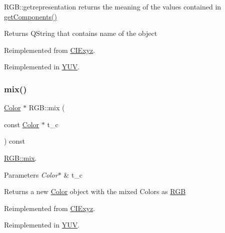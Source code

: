 R\+G\+B\+::getrepresentation returns the meaning of the values contained in \hyperlink{class_r_g_b_ad085d3bd654d874ea2e5739a5c216769}{get\+Components()} 

\begin{DoxyReturn}{Returns}
Q\+String that contains name of the object 
\end{DoxyReturn}


Reimplemented from \hyperlink{class_c_i_exyz_a19120c15d1304696909d76fae6065ebd}{C\+I\+Exyz}.



Reimplemented in \hyperlink{class_y_u_v_ae38403ffd397003eb28ab7670f95d1e5}{Y\+UV}.

\mbox{\label{class_r_g_b_aa022866e33474ab64f81d367c6b030b9}} 
\subsubsection{\texorpdfstring{mix()}{mix()}}
{\footnotesize\ttfamily \hyperlink{class_color}{Color} $\ast$ R\+G\+B\+::mix (\begin{DoxyParamCaption}\item[{const \hyperlink{class_color}{Color} $\ast$}]{t\+\_\+c }\end{DoxyParamCaption}) const\hspace{0.3cm}{\ttfamily [virtual]}}



\hyperlink{class_r_g_b_aa022866e33474ab64f81d367c6b030b9}{R\+G\+B\+::mix}. 


\begin{DoxyParams}{Parameters}
{\em Color$\ast$} & t\+\_\+c \\
\hline
\end{DoxyParams}
\begin{DoxyReturn}{Returns}
a new \hyperlink{class_color}{Color} object with the mixed Colors as \hyperlink{class_r_g_b}{R\+GB} 
\end{DoxyReturn}


Reimplemented from \hyperlink{class_c_i_exyz_af8eeb48ade44beea43d023b36d263fc8}{C\+I\+Exyz}.



Reimplemented in \hyperlink{class_y_u_v_ab152a4ea37eaa67df0b38882c2099da3}{Y\+UV}.

\mbox{\label{class_r_g_b_a7aad38ac17ec3201c65f8f5e90637b69}} 
